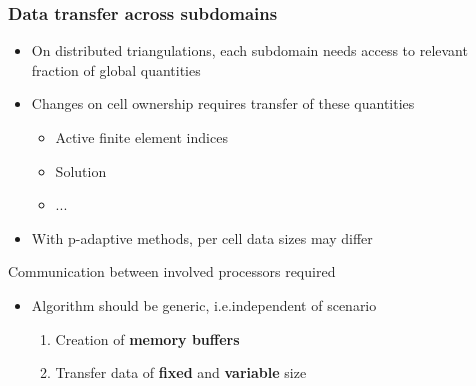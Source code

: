 \begin{frame}
\frametitle{Data transfer across subdomains}

\begin{itemize}
\item On distributed triangulations, each subdomain needs access to relevant fraction of global quantities
\item Changes on cell ownership requires transfer of these quantities
  \begin{itemize}
  \item Active finite element indices
  \item Solution
  \item ...
  \end{itemize}
\item With p-adaptive methods, per cell data sizes may differ
\end{itemize}

\vspace{-.7em}
\begin{block}{\vspace{-.7em}}
  \centering
  Communication between involved processors required
\end{block}

\vfill{}

\begin{itemize}
\item Algorithm should be generic, i.e.\@ independent of scenario
  \begin{enumerate}
  \item Creation of \textbf{memory buffers}
  \item Transfer data of \textbf{fixed} and \textbf{variable} size
  \end{enumerate}
\end{itemize}
\end{frame}





